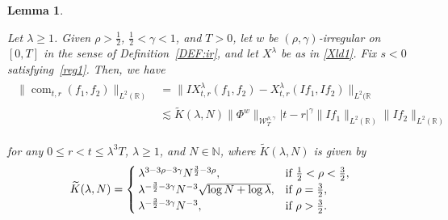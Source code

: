 \documentclass[letterpaper, 11pt,  reqno]{amsart}
\newtheorem{lemma}[theorem]{Lemma}
\DeclareMathOperator{\com}{com}
\newcommand{\1}{\hspace{0.5mm}\text{I}\hspace{0.5mm}}
\newcommand{\noi}{\noindent}
\newcommand{\R}{\mathbb{R}}
\newcommand{\g}{\gamma}
\newcommand{\ld}{\lambda}
\newcommand{\wt}{\widetilde}
\newcommand{\les}{\lesssim}
\newcommand{\N}{\mathbb{N}}
\newcommand{\W}{\mathcal{W}}
\numberwithin{equation}{section}
\numberwithin{theorem}{section}
\begin{document}
\begin{lemma}
\label{LEM:com2}

Let $\ld \ge 1$.
Given $\rho  >  \frac 12$,  $\frac 12 < \g < 1$,  and $T> 0$, 
let  $w$ be $(\rho,\g)$-irregular
on $[0, T]$ 
 in the sense of Definition~\ref{DEF:ir}, 
 and let $X^\ld$ be as in \eqref{Xld1}.
Fix  $s < 0$ satisfying~\eqref{reg1}.
Then, we have 
\begin{align}
\begin{aligned}
 \|\com_{t, r}(f_1, f_2) \|_{L^2(\R)}
 &  = \|IX^{\ld}_{t,r}( f _1, f _2) - X^{\ld}_{t,r} (I f _1,I f _2) \|_{L^2(\R}\\
& \les
\wt    K(\ld, N )\| \Phi^{w} \|_{\W_{T}^{\rho, \g}}
      |t-r|^{\g}
\| I  f _1 \|_{L^2(\R)}   \| I  f _2 \|_{L^2(\R)}  
\end{aligned}
\label{RI1}
\end{align}





\noi
for any $0\leq r<t\leq \ld^3T$, $\ld \ge 1$, and $N \in \N$, 
where $ \wt K(\ld, N )$ is 
given by 
\begin{align}
\wt K(\ld, N )
= \begin{cases}
\ld^{3- 3\rho-3\g} N^{\frac 32 - 3\rho}, & \text{if $\frac 12 < \rho < \frac 32$}, \\
\ld^{- \frac 32 - 3\g} N^{-3} \sqrt{\log N + \log \ld}, & \text{if $\rho =  \frac 32$}, \\
\ld^{ - \frac 32 - 3\g } N^{-3}, & \text{if $ \rho >  \frac 32$}.
\end{cases}
\label{RI1a}
\end{align}





\end{lemma}
\end{document}
